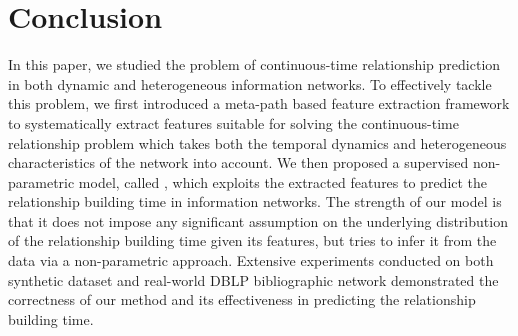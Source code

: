 \section{Conclusion}\label{sec:conclusion}
In this paper, we studied the problem of continuous-time relationship prediction in both dynamic and heterogeneous information networks. To effectively tackle this problem, we first introduced a meta-path based feature extraction framework to systematically extract features suitable for solving the continuous-time relationship problem which takes both the temporal dynamics and heterogeneous characteristics of the network into account. We then proposed a supervised non-parametric model, called \npglm, which exploits the extracted features to predict the relationship building time in information networks. The strength of our model is that it does not impose any significant assumption on the underlying distribution of the relationship building time given its features, but tries to infer it from the data via a non-parametric approach. Extensive experiments conducted on both synthetic dataset and real-world DBLP bibliographic network demonstrated the correctness of our method and its effectiveness in predicting the relationship building time.\\